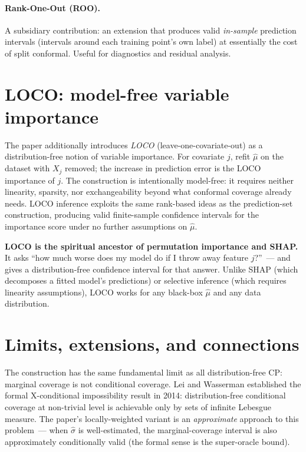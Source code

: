 \documentclass[letterpaper,11pt,leqno]{article}
\begin{document}
\paragraph{Rank-One-Out (ROO).} A subsidiary contribution: an extension that produces valid \emph{in-sample} prediction intervals (intervals around each training point's own label) at essentially the cost of split conformal. Useful for diagnostics and residual analysis.

\section{LOCO: model-free variable importance}\label{s:loco}

The paper additionally introduces \emph{LOCO} (leave-one-covariate-out) as a distribution-free notion of variable importance. For covariate $j$, refit $\hat{\mu}$ on the dataset with $X_j$ removed; the increase in prediction error is the LOCO importance of $j$. The construction is intentionally model-free: it requires neither linearity, sparsity, nor exchangeability beyond what conformal coverage already needs. LOCO inference exploits the same rank-based ideas as the prediction-set construction, producing valid finite-sample confidence intervals for the importance score under no further assumptions on $\hat{\mu}$.

\begin{keyinsight}
\textbf{LOCO is the spiritual ancestor of permutation importance and SHAP.} It asks ``how much worse does my model do if I throw away feature $j$?''~--- and gives a distribution-free confidence interval for that answer. Unlike SHAP (which decomposes a fitted model's predictions) or selective inference (which requires linearity assumptions), LOCO works for any black-box $\hat{\mu}$ and any data distribution.
\end{keyinsight}

\section{Limits, extensions, and connections}\label{s:discussion}

The construction has the same fundamental limit as all distribution-free CP: marginal coverage is not conditional coverage. Lei and Wasserman \cite{lei2014distribution} established the formal X-conditional impossibility result in 2014: distribution-free conditional coverage at non-trivial level is achievable only by sets of infinite Lebesgue measure. The paper's locally-weighted variant is an \emph{approximate} approach to this problem~--- when $\hat{\sigma}$ is well-estimated, the marginal-coverage interval is also approximately conditionally valid (the formal sense is the super-oracle bound).
\end{document}
